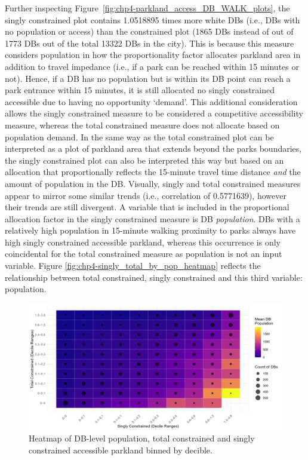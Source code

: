 \documentclass[
11pt, %
oneside, %
english, %
singlespacing, %
]{macthesis} %
\begin{document}
Further inspecting Figure~\ref{fig:chp4-parkland_access_DB_WALK_plots}, the singly constrained plot contains 1.0518895 times more white DBs (i.e., DBs with no population or access) than the constrained plot (1865 DBs instead of out of 1773 DBs out of the total 13322 DBs in the city). This is because this measure considers population in how the proportionality factor allocates parkland area in addition to travel impedance (i.e., if a park can be reached within 15 minutes or not). Hence, if a DB has no population but is within its DB point can reach a park entrance within 15 minutes, it is still allocated no singly constrained accessible due to having no opportunity `demand'. This additional consideration allows the singly constrained measure to be considered a competitive accessibility measure, whereas the total constrained measure does not allocate based on population demand. In the same way as the total constrained plot can be interpreted as a plot of parkland area that extends beyond the parks boundaries, the singly constrained plot can also be interpreted this way but based on an allocation that proportionally reflects the 15-minute travel time distance \emph{and} the amount of population in the DB. Visually, singly and total constrained measures appear to mirror some similar trends (i.e., correlation of 0.5771639), however their trends are still divergent. A variable that is included in the proportional allocation factor in the singly constrained measure is DB \emph{population}. DBs with a relatively high population in 15-minute walking proximity to parks always have high singly constrained accessible parkland, whereas this occurrence is only coincidental for the total constrained measure as population is not an input variable. Figure \ref{fig:chp4-singly_total_by_pop_heatmap} reflects the relationship between total constrained, singly constrained and this third variable: population.

\begin{figure}

{\centering \includegraphics[width=6in]{./data/figures/chp4-singly_total_by_pop_heatmap} 

}

\caption{\label{fig:chp4-singly_total_by_pop_heatmap}Heatmap of DB-level population, total constrained and singly constrained accessible parkland binned by decible.}\label{fig:unnamed-chunk-57}
\end{figure}
\end{document}
